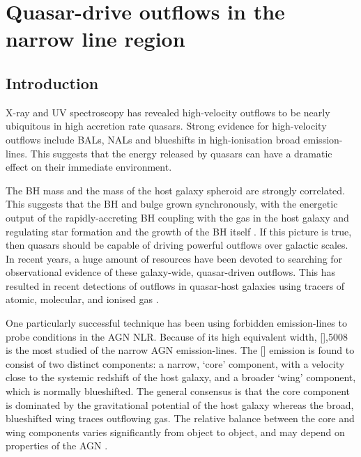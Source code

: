 
\chapter{Quasar-drive outflows in the narrow line region}
\label{ch:nlr} 

\section{Introduction}

X-ray and UV spectroscopy has revealed high-velocity outflows to be nearly ubiquitous in high accretion rate quasars.
Strong evidence for high-velocity outflows include BALs, NALs and blueshifts in high-ionisation broad emission-lines. 
This suggests that the energy released by quasars can have a dramatic effect on their immediate environment. 

The BH mass and the mass of the host galaxy spheroid are strongly correlated.
This suggests that the BH and bulge grown synchronously, with the energetic output of the rapidly-accreting BH coupling with the gas in the host galaxy and regulating star formation and the growth of the BH itself \citep[e.g.][]{silk98,king03,dimatteo05,king15}.
If this picture is true, then quasars should be capable of driving powerful outflows over galactic scales. 
In recent years, a huge amount of resources have been devoted to searching for observational evidence of these galaxy-wide, quasar-driven outflows. 
This has resulted in recent detections of outflows in quasar-host galaxies using tracers of atomic, molecular, and ionised gas \citep[e.g.][]{nesvadba06,arav08,nesvadba08,moe09,dunn10,alexander10,harrison12,harrison14,nesvadba10,rupke13,veilleux13,nardini15,feruglio10,alatalo11,cimatti13,cicone14}.  

One particularly successful technique has been using forbidden emission-lines to probe conditions in the AGN NLR. 
Because of its high equivalent width, [],5008 is the most studied of the narrow AGN emission-lines. 
The [] emission is found to consist of two distinct components: a narrow, `core' component, with a velocity close to the systemic redshift of the host galaxy, and a broader `wing' component, which is normally blueshifted. 
The general consensus is that the core component is dominated by the gravitational potential of the host galaxy whereas the broad, blueshifted wing traces outflowing gas. 
The relative balance between the core and wing components varies significantly from object to object, and may depend on properties of the AGN \citep[e.g. luminosity;][]{shen14}. 


